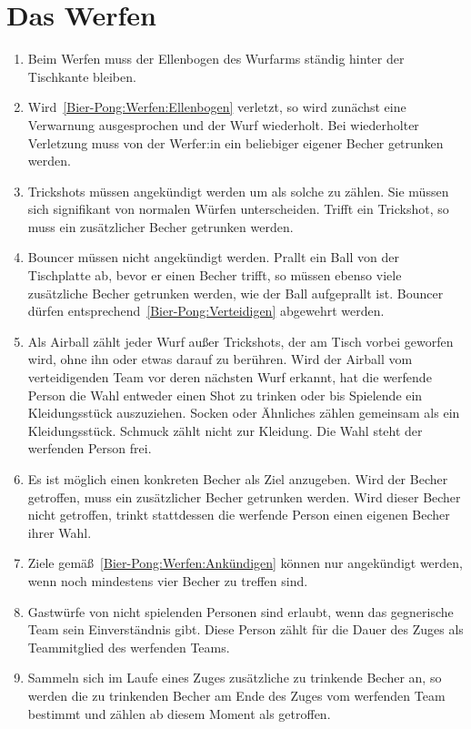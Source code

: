 \section{Das Werfen}
\begin{enumerate}[label={(\arabic*)}]
    \item\label{Bier-Pong:Werfen:Ellenbogen}
    Beim Werfen muss der Ellenbogen des Wurfarms ständig hinter der Tischkante bleiben.

    \item
    Wird~\ref{Bier-Pong:Werfen:Ellenbogen} verletzt, so wird zunächst eine Verwarnung ausgesprochen und der Wurf wiederholt.
    Bei wiederholter Verletzung muss von der Werfer:in ein beliebiger eigener Becher getrunken werden.

    \item
    Trickshots\grqq{} müssen angekündigt werden um als solche zu zählen.
    Sie müssen sich signifikant von normalen Würfen unterscheiden.
    Trifft ein Trickshot, so muss ein zusätzlicher Becher getrunken werden.

    \item
    \glqq{}Bouncer\grqq{} müssen nicht angekündigt werden.
    Prallt ein Ball von der Tischplatte ab, bevor er einen Becher trifft, so müssen ebenso viele zusätzliche Becher getrunken werden, wie der Ball aufgeprallt ist.
    Bouncer dürfen entsprechend~\ref{Bier-Pong:Verteidigen} abgewehrt werden.

    \item
    Als \glqq{}Airball\grqq{} zählt jeder Wurf außer Trickshots, der am Tisch vorbei geworfen wird, ohne ihn oder etwas darauf zu berühren.
    Wird der Airball vom verteidigenden Team vor deren nächsten Wurf erkannt, hat die werfende Person die Wahl entweder einen Shot zu trinken oder bis Spielende ein Kleidungsstück auszuziehen.
    Socken oder Ähnliches zählen gemeinsam als ein Kleidungsstück.
    Schmuck zählt nicht zur Kleidung.
    Die Wahl steht der werfenden Person frei.

    \item\label{Bier-Pong:Werfen:Ankündigen}
    Es ist möglich einen konkreten Becher als Ziel anzugeben.
    Wird der Becher getroffen, muss ein zusätzlicher Becher getrunken werden.
    Wird dieser Becher nicht getroffen, trinkt stattdessen die werfende Person einen eigenen Becher ihrer Wahl.

    \item
    Ziele gemäß~\ref{Bier-Pong:Werfen:Ankündigen} können nur angekündigt werden, wenn noch mindestens vier Becher zu treffen sind.

    \item
    Gastwürfe von nicht spielenden Personen sind erlaubt, wenn das gegnerische Team sein Einverständnis gibt.
    Diese Person zählt für die Dauer des Zuges als Teammitglied des werfenden Teams.

    \item
    Sammeln sich im Laufe eines Zuges zusätzliche zu trinkende Becher an, so werden die zu trinkenden Becher am Ende des Zuges vom werfenden Team bestimmt und zählen ab diesem Moment als getroffen.
\end{enumerate}

